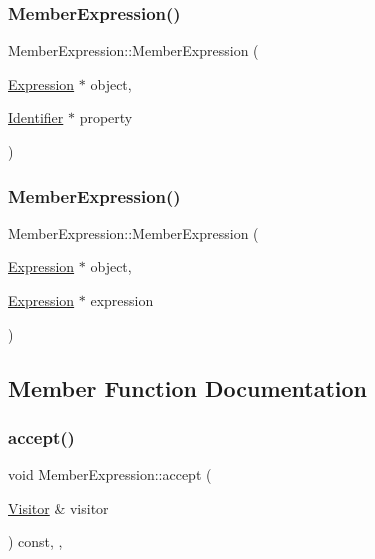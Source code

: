 \subsubsection{\texorpdfstring{Member\+Expression()}{MemberExpression()}\hspace{0.1cm}{\footnotesize\ttfamily [1/2]}}
{\footnotesize\ttfamily Member\+Expression\+::\+Member\+Expression (\begin{DoxyParamCaption}\item[{\hyperlink{struct_expression}{Expression} $\ast$}]{object,  }\item[{\hyperlink{struct_identifier}{Identifier} $\ast$}]{property }\end{DoxyParamCaption})\hspace{0.3cm}{\ttfamily [inline]}}

\mbox{\label{struct_member_expression_aa14ba789623f83a9aaab2d437bf18c90}} 
\subsubsection{\texorpdfstring{Member\+Expression()}{MemberExpression()}\hspace{0.1cm}{\footnotesize\ttfamily [2/2]}}
{\footnotesize\ttfamily Member\+Expression\+::\+Member\+Expression (\begin{DoxyParamCaption}\item[{\hyperlink{struct_expression}{Expression} $\ast$}]{object,  }\item[{\hyperlink{struct_expression}{Expression} $\ast$}]{expression }\end{DoxyParamCaption})\hspace{0.3cm}{\ttfamily [inline]}}



\subsection{Member Function Documentation}
\mbox{\label{struct_member_expression_a04c3360eda4db02e733746882830b92c}} 
\subsubsection{\texorpdfstring{accept()}{accept()}}
{\footnotesize\ttfamily void Member\+Expression\+::accept (\begin{DoxyParamCaption}\item[{\hyperlink{struct_visitor}{Visitor} \&}]{visitor }\end{DoxyParamCaption}) const\hspace{0.3cm}{\ttfamily [inline]}, {\ttfamily [override]}, {\ttfamily [virtual]}}



